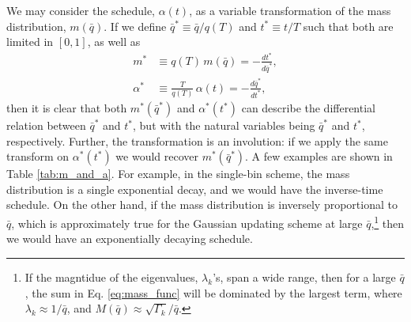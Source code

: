 \documentclass[reprint, superscriptaddress, floatfix]{revtex4-1}
\begin{document}
We may consider the schedule, $\alpha(t)$,
as a variable transformation of
the mass distribution, $m(\bar q)$.
%
If we define
$\bar q^* \equiv \bar q/q(T)$
and $t^* \equiv t/T$
such that both are limited in $[0, 1]$,
as well as
\begin{align*}
  m^*       &\equiv q(T) \, m(\bar q) = -\frac{ dt^* } { d\bar q^* },
  \\
  \alpha^*  &\equiv \frac{T}{q(T)} \, \alpha(t) = -\frac{ d\bar q^* } { dt^* },
\end{align*}
then it is clear that
both $m^*(\bar q^*)$ and $\alpha^*(t^*)$
can describe the differential relation
between $\bar q^*$ and $t^*$,
but with the natural variables
being $\bar q^*$ and $t^*$, respectively.
%
Further, the transformation is an involution:
if we apply the same transform on $\alpha^*(t^*)$
we would recover $m^*(\bar q^*)$.
%
A few examples are shown in Table \ref{tab:m_and_a}.
%
For example, in the single-bin scheme,
the mass distribution is a single exponential decay,
and we would have the inverse-time schedule.
%
On the other hand,
if the mass distribution is inversely proportional to $\bar q$,
which is approximately true for the Gaussian updating scheme
at large $\bar q$,\footnote{If
  the magntidue of the eigenvalues, $\lambda_k$'s,
  span a wide range, then for a large $\bar q$,
  the sum in Eq. \eqref{eq:mass_func} will be dominated by
  the largest term, where $\lambda_k \approx 1/\bar q$,
  and $M(\bar q) \approx \sqrt{\Gamma_k}/\bar q$.
  }
then we would have an exponentially decaying schedule.
\end{document}
